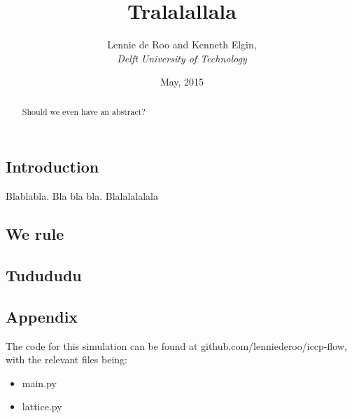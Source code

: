 \documentclass[a4paper]{article}
\begin{document}
\title{\textbf{Tralalallala}}
\author{Lennie de Roo and Kenneth Elgin, \\
 \emph{Delft University of Technology}}
\date{\normalsize{May, 2015}}
\maketitle 
\noindent \hrulefill
\begin{abstract}
{\color{blue}Should we even have an abstract?}
\end{abstract}
\hrulefill

\subsection*{Introduction}
Blablabla. Bla bla bla. Blalalalalala
\subsection*{We rule}

\subsection*{Tudududu}
\subsection*{Appendix}
The code for this simulation can be found at github.com/lenniederoo/iccp-flow, with the relevant files being:
\begin{itemize}
\item main.py
\item lattice.py
\end{itemize}
\end{document}
